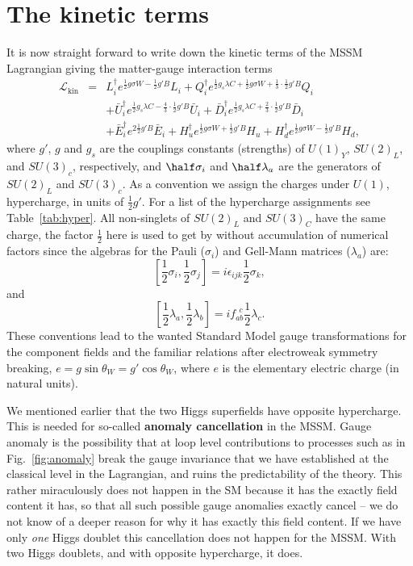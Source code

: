 \documentclass[notes.tex]{subfiles}
\begin{document}
\section{The kinetic terms}
\label{sec:mssm_kinetic_terms}
It is now straight forward to write down the kinetic terms of the MSSM Lagrangian giving the matter-gauge interaction terms
\begin{eqnarray}\label{eq:kinlag}
\mathcal{L}_\text{kin} &=& L_i^\dagger e^{\frac{1}{2}g \sigma W - \frac{1}{2} g' B}L_i + Q_i^\dagger e^{\frac{1}{2}g_s\lambda C + \frac{1}{2}g\sigma W + \frac{1}{3}\cdot \frac{1}{2} g' B}Q_i \nonumber\\
&&+\bar{U}_{i}^\dagger e^{\frac{1}{2}g_s \lambda C - \frac{4}{3}\cdot \frac{1}{2} g' B}\bar{U}_i + \bar{D}_i^\dagger e^{\frac{1}{2} g_s\lambda C + \frac{2}{3}\cdot \frac{1}{2} g' B}\bar{D}_i \nonumber\\
&& + \bar{E}_i^\dagger e^{2\frac{1}{2} g' B}\bar{E}_i + H_u^\dagger e^{\frac{1}{2} g \sigma W + \frac{1}{2} g'B}H_u + H_d^\dagger e^{\frac{1}{2}g \sigma W - \frac{1}{2} g' B}H_d,
\end{eqnarray}
where $g'$, $g$ and $g_s$ are the couplings constants (strengths) of $U(1)_Y$, $SU(2)_L$, and $SU(3)_c$, respectively, and $\half\sigma_i$ and $\half\lambda_a$ are the generators of  $SU(2)_L$ and $SU(3)_c$. As a convention we assign the charges under $U(1)$, hypercharge, in units of $\frac{1}{2}g'$. For a list of the hypercharge assignments see Table~\ref{tab:hyper}.  All non-singlets of $SU(2)_L$ and $SU(3)_C$ have the same charge, the factor $\frac{1}{2}$ here is used to get by without accumulation of numerical factors since the algebras for the Pauli ($\sigma_i$) and Gell-Mann matrices ($\lambda_a$) are:
\[ \left[\frac{1}{2}\sigma_i, \frac{1}{2} \sigma_j\right] = i \epsilon_{ijk}\frac{1}{2}\sigma_k,\]
and
\[ \left[\frac{1}{2}\lambda_a, \frac{1}{2} \lambda_b\right] = i f_{ab}^{~~c}\frac{1}{2}\lambda_c.\]
These conventions lead to the wanted Standard Model gauge transformations for the component fields and the familiar relations after electroweak symmetry breaking, $e = g\sin\theta_W = g'\cos\theta_W$, where $e$ is the elementary electric charge (in natural units).

We mentioned earlier that the two Higgs superfields have opposite hypercharge. This is needed for so-called {\bf anomaly cancellation} in the MSSM. Gauge anomaly is the possibility that at loop level contributions to processes such as in Fig.~\ref{fig:anomaly} break the gauge invariance that we have established at the classical level in the Lagrangian, and ruins the predictability of the theory. This rather miraculously does not happen in the SM because it has the exactly field content it has, so that all such possible gauge anomalies exactly cancel -- we do not know of a deeper reason for why it has exactly this field content. If we have only {\it one} Higgs doublet this cancellation does not happen for the MSSM. With two Higgs doublets, and with opposite hypercharge, it does.
\end{document}
